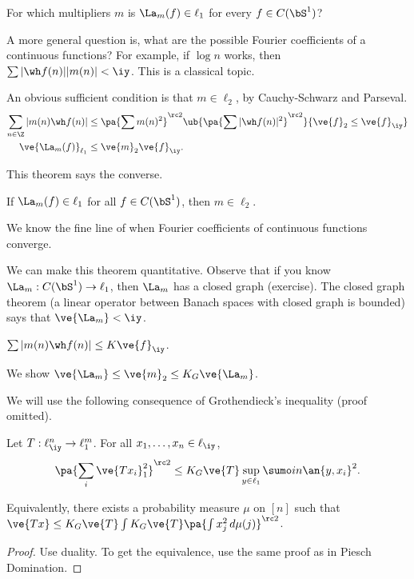 For which multipliers $m$ is $\La_m(f)\in \ell_1$ for every $f\in C(\bS^1)$?

A more general question is, what are the possible Fourier coefficients of a continuous functions? For example, if $\log n$ works, then $\sum |\wh f(n)||m(n)|<\iy$. This is a classical topic.

An obvious sufficient condition is  that $m\in \ell_2$, by Cauchy-Schwarz and Parseval.
\begin{align}
\sum_{n\in \Z} |m(n)\wh f(n)|& \le \pa{\sum m(n)^2}^{\rc 2} \ub{\pa{\sum |\wh f(n)|^2}^{\rc 2}}{\ve{f}_2\le \ve{f}_{\iy}}\\
\ve{\La_m(f)}_{\ell_1}&\le \ve{m}_2\ve{f}_{\iy}.
\end{align}

This theorem says the converse.
\begin{thm}[Orlicz-Paley-Sidon] %
If $\La_m(f)\in \ell_1$ for all $f\in C(\bS^1)$, then $m\in \ell_2$.
\end{thm}
We know the fine line of when Fourier coefficients of continuous functions converge. 

We can make this theorem quantitative. Observe that if you know $\La_m:C(\bS^1) \to \ell_1$, then $\La_m$ has a closed graph (exercise). The closed graph theorem (a linear operator between Banach spaces with closed graph is bounded) says that $\ve{\La_m}<\iy$. 

\begin{cor}
$\sum|m(n)\wh f(n)|\le K\ve{f}_{\iy}$.
\end{cor}

We show $\ve{\La_m}\le \ve{m}_2\le K_G\ve{\La_m}$.

We will use the following consequence of Grothendieck's inequality (proof omitted).
\begin{cor}
Let $T:\ell_{\iy}^n\to \ell_1^m$. For all $x_1,\ldots, x_n\in \ell_\iy$, 
\[
\pa{\sum_i \ve{Tx_i}_1^2}^{\rc 2} \le K_G\ve{T}  \sup_{y\in \ell_1}{\sumo in \an{y,x_i}^2}.
\]

Equivalently, there exists a probability measure $\mu$ on $[n]$ such that $\ve{Tx}\le K_G\ve{T}\int  K_G\ve{T}\pa{\int x_j^2 \,d\mu(j)}^{\rc 2}$.
\end{cor}
\begin{proof}
Use duality. To get the equivalence, use the same proof as in Piesch Domination.
\end{proof}

